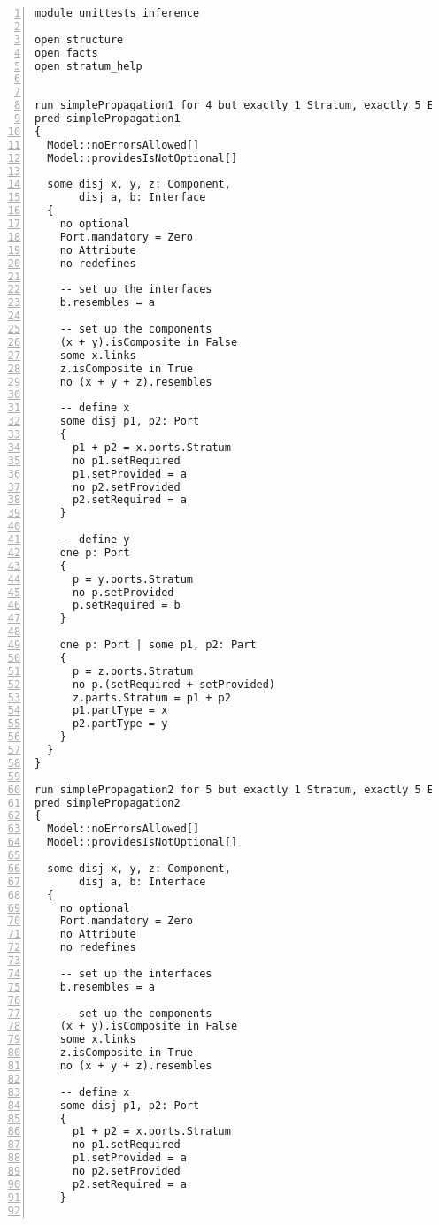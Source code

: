 \lstset{frame=tb, aboveskip=12pt, belowskip=-3pt, breaklines=true, basicstyle=\tiny\ttfamily, tabsize=2, mathescape=true}
\begin{lstlisting}[caption={unittests\_inference.als}, numbers=left]
module unittests_inference

open structure
open facts
open stratum_help


run simplePropagation1 for 4 but exactly 1 Stratum, exactly 5 Element, exactly 4 Port, exactly 2 Part, exactly 3 Component, exactly 2 Interface, exactly 2 Connector, 7 LinkEnd
pred simplePropagation1
{
  Model::noErrorsAllowed[]
  Model::providesIsNotOptional[]

  some disj x, y, z: Component,
       disj a, b: Interface
  {
    no optional
    Port.mandatory = Zero
    no Attribute
    no redefines
  
    -- set up the interfaces
    b.resembles = a
  
    -- set up the components
    (x + y).isComposite in False
    some x.links
    z.isComposite in True
    no (x + y + z).resembles
    
    -- define x
    some disj p1, p2: Port
    {
      p1 + p2 = x.ports.Stratum
      no p1.setRequired
      p1.setProvided = a
      no p2.setProvided
      p2.setRequired = a
    }
    
    -- define y
    one p: Port
    {
      p = y.ports.Stratum
      no p.setProvided
      p.setRequired = b
    }
    
    one p: Port | some p1, p2: Part
    {
      p = z.ports.Stratum
      no p.(setRequired + setProvided)
      z.parts.Stratum = p1 + p2
      p1.partType = x
      p2.partType = y
    }
  }
}

run simplePropagation2 for 5 but exactly 1 Stratum, exactly 5 Element, exactly 4 Port, exactly 3 Part, exactly 3 Component, exactly 2 Interface, exactly 3 Connector, 9 LinkEnd, 6 ConnectorEnd
pred simplePropagation2
{
  Model::noErrorsAllowed[]
  Model::providesIsNotOptional[]

  some disj x, y, z: Component,
       disj a, b: Interface
  {
    no optional
    Port.mandatory = Zero
    no Attribute
    no redefines
  
    -- set up the interfaces
    b.resembles = a
  
    -- set up the components
    (x + y).isComposite in False
    some x.links
    z.isComposite in True
    no (x + y + z).resembles
    
    -- define x
    some disj p1, p2: Port
    {
      p1 + p2 = x.ports.Stratum
      no p1.setRequired
      p1.setProvided = a
      no p2.setProvided
      p2.setRequired = a
    }
    

\end{lstlisting}
